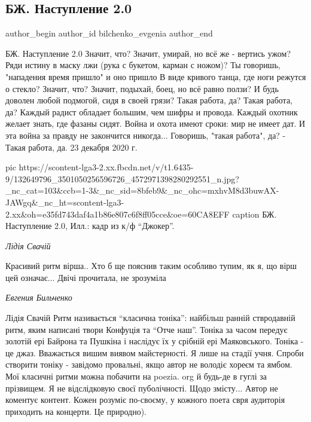  
 
 
 
 
 
\subsection{БЖ. Наступление 2.0}
\label{sec:23_12_2020.fb.bilchenko_evgenia.1.nastuplenie_2_0}
\ifcmt
 author_begin
   author_id bilchenko_evgenia
 author_end
\fi

БЖ. Наступление 2.0
Значит, что? Значит, умирай, но всё же - вертись ужом?
Ряди истину в маску лжи (рука с букетом, карман с ножом)?
Ты говоришь, "нападения время пришло" и оно пришло
В виде кривого танца, где ноги режутся о стекло?
Значит, что? Значит, подыхай, боец, но всё равно ползи?
И будь доволен любой подмогой, сидя в своей грязи?
Такая работа, да? Такая работа, да?
Каждый радист обладает большим, чем шифры и провода.
Каждый охотник желает знать, где фазаны сидят.
Война и охота имеют сроки: мир не имеет дат.
И эта война за правду не закончится никогда...
Говоришь, "такая работа", да? 
- Такая работа, да.
23 декабря 2020 г.

\ifcmt
  pic https://scontent-lga3-2.xx.fbcdn.net/v/t1.6435-9/132649796_3501050256596726_4572971398280292551_n.jpg?_nc_cat=103&ccb=1-3&_nc_sid=8bfeb9&_nc_ohc=mxhvM8d3buwAX-JAWgq&_nc_ht=scontent-lga3-2.xx&oh=e35fd743daf4a1b86e807c6f8ff05cce&oe=60CA8EFF
	caption БЖ. Наступление 2.0, Илл.: кадр из к/ф \enquote{Джокер}.
\fi

\emph{Лідія Свачій}

Красивий ритм вірша.. Хто б ще пояснив таким особливо тупим, як я, що вірш цей
означає... Двічі прочитала, не зрозуміла

\emph{Евгения Бильченко}

Лідія Свачій Ритм називається \enquote{класична тоніка}: найбільш ранній ствродавній
ритм, яким написані твори Конфуція та \enquote{Отче наш}. Тоніка за часом передує
золотій ері Байрона та Пушкіна і наслідує їх у срібній ері Маяковського. Тоніка
- це джаз. Вважається вишим виявом майстерності. Я лише на стадії учня. Спроби
створити тоніку - завідомо провальні, якщо автор не володіє хореєм та ямбом.
Мої класичні ритми можна побачити на poezia. org й будь-де в гуглі за
прізвищем. Я не відслідковую своєї пуболічності. Щодо змісту... Автор не
коментує контент. Кожен розуміє по-своєму, у кожного поета свря аудиторія
приходить на концерти. Це природно).

